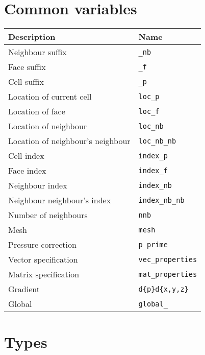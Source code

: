 \documentclass[11pt]{report}
\begin{document}
\section{Common variables}
  \begin{tabular}[h]{|l|l|}
    \hline
    \textbf{Description}                       & \textbf{Name}   \\
    \hline
    \hline
    Neighbour suffix                  & \texttt{\_nb}   \\
  Face suffix                       & \texttt{\_f}    \\
  Cell suffix                       & \texttt{\_p}    \\
  Location of current cell          & \texttt{loc\_p} \\
  Location of face                  & \texttt{loc\_f} \\
  Location of neighbour             & \texttt{loc\_nb} \\
  Location of neighbour's neighbour & \texttt{loc\_nb\_nb} \\
  Cell index                        & \texttt{index\_p} \\
  Face index                        & \texttt{index\_f} \\
  Neighbour index                   & \texttt{index\_nb} \\
  Neighbour neighbour's index       & \texttt{index\_nb\_nb} \\
  Number of neighbours              & \texttt{nnb}           \\
  Mesh                              & \texttt{mesh}          \\
  Pressure correction               & \texttt{p\_prime}      \\
  Vector specification              & \texttt{vec\_properties} \\
  Matrix specification              & \texttt{mat\_properties} \\
  Gradient                          & \texttt{d\{p\}d\{x,y,z\}} \\
  Global                            & \texttt{global\_}         \\
  \hline 
\end{tabular}

\section{Types}
\end{document}
